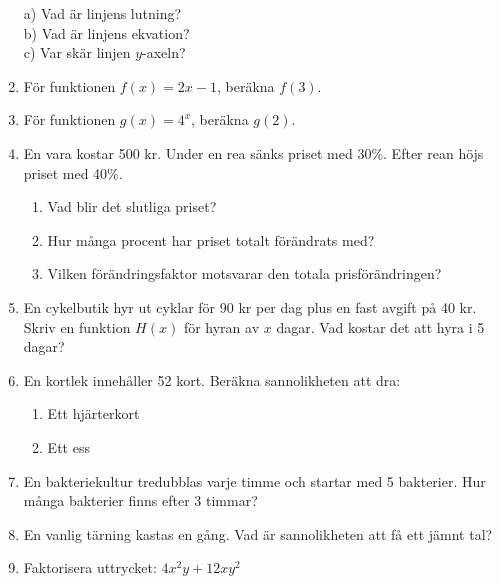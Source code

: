 \documentclass[a4paper,11pt]{article}
\begin{document}
\begin{enumerate}[label=\textbf{\arabic*.}]
\begin{center}
    \end{center}
    a) Vad är linjens lutning? \\
    b) Vad är linjens ekvation? \\
    c) Var skär linjen $y$-axeln? \\
    \item För funktionen $f(x) = 2x - 1$, beräkna $f(3)$.
    \item För funktionen $g(x) = 4^x$, beräkna $g(2)$.
    \item En vara kostar 500 kr. Under en rea sänks priset med 30\%. Efter rean höjs priset med 40\%.
    \begin{enumerate}[label=\alph*)]
        \item Vad blir det slutliga priset?
        \item Hur många procent har priset totalt förändrats med?
        \item Vilken förändringsfaktor motsvarar den totala prisförändringen?
    \end{enumerate}
    \item En cykelbutik hyr ut cyklar för 90 kr per dag plus en fast avgift på 40 kr. Skriv en funktion $H(x)$ för hyran av $x$ dagar. Vad kostar det att hyra i 5 dagar?
    \item En kortlek innehåller 52 kort. Beräkna sannolikheten att dra:
    \begin{enumerate}[label=\alph*)]
        \item Ett hjärterkort
        \item Ett ess
    \end{enumerate}
    \item En bakteriekultur tredubblas varje timme och startar med 5 bakterier. Hur många bakterier finns efter 3 timmar?
    \item En vanlig tärning kastas en gång. Vad är sannolikheten att få ett jämnt tal?
    \item Faktorisera uttrycket: $4x^2y + 12xy^2$
\end{enumerate}

\newpage
\end{document}
